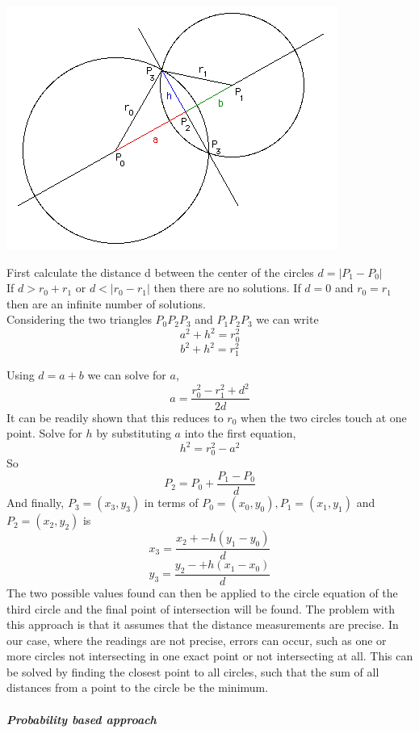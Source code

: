 \includegraphics[scale=0.4]{DIAGRAMS/circles.png}

\noindent First calculate the distance d between the center of the circles $d = |P_1 - P_0|$\\
If $d > r_0 + r_1$ or $d < |r_0 - r_1|$ then there are no solutions. If $d = 0$ and $r_0 = r_1$ then are an infinite number of solutions.\\
Considering the two triangles $P_0P_2P_3$ and $P_1P_2P_3$ we can write $$a^2 + h^2 = r_0^2$$ $$b^2 + h^2 = r_1^2$$

\noindent Using $d = a + b$ we can solve for $a$,
$$a = \frac{r_0^2 - r_1^2 +d^2}{2d}$$
It can be readily shown that this reduces to $r_0$ when the two circles touch at one point.
Solve for $h$ by substituting $a$ into the first equation, $$h^2 = r_0^2 - a^2$$
So $$P_2 = P_0 + \frac{P_1 - P_0}{d}$$
And finally, $P_3 = (x_3, y_3)$ in terms of $P_0 = (x_0, y_0),  P_1 = (x_1, y_1)$ and $P_2 = (x_2, y_2)$ is $$x_3 =\frac{x_2 + -h(y_1 - y_0)}{d}$$ $$y_3 =\frac{y_2 - +h(x_1 - x_0)}{d}$$
The two possible values found can then be applied to the circle equation of the third circle and the final point of intersection will be found. The problem with this approach is that it assumes that the distance measurements are precise. In our case, where the readings are not precise, errors can occur, such as one or more circles not intersecting in one exact point or not intersecting at all. This can be solved by finding the closest point to all circles, such that the sum of all distances from a point to the circle be the minimum.\\
\\
\textit{\textbf{Probability based approach}}

